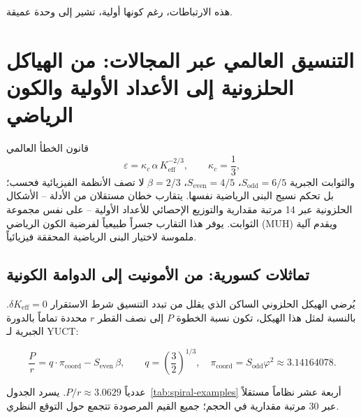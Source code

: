 \documentclass[11pt,a4paper]{article}
\newcommand{\ar}[1]{\foreignlanguage{arabic}{#1}}
\newcommand{\Keff}{K_{\mathrm{eff}}}
\newcommand{\eps}{\varepsilon}
\newcommand{\kappac}{\kappa_c}
\begin{document}
	\ar{هذه الارتباطات، رغم كونها أولية، تشير إلى وحدة عميقة.}
	
	\section{\ar{التنسيق العالمي عبر المجالات: من الهياكل الحلزونية إلى الأعداد الأولية والكون الرياضي}}
	\label{sec:universal}
	
	\ar{قانون الخطأ العالمي}
	\begin{equation}
		\eps = \kappac\,\alpha\,\Keff^{-2/3}, \qquad \kappac = \frac{1}{3},
		\label{eq:errorlaw}
	\end{equation}
	\ar{والثوابت الجبرية \(S_{\mathrm{odd}}=6/5\)، \(S_{\mathrm{even}}=4/5\)، \(\beta=2/3\) لا تصف الأنظمة الفيزيائية فحسب؛ بل تحكم نسيج البنى الرياضية نفسها. يتقارب خطان مستقلان من الأدلة – الأشكال الحلزونية عبر 14 مرتبة مقدارية والتوزيع الإحصائي للأعداد الأولية – على نفس مجموعة الثوابت. يوفر هذا التقارب جسراً طبيعياً لفرضية الكون الرياضي (MUH) ويقدم آلية ملموسة لاختيار البنى الرياضية المحققة فيزيائياً.}
	
	\subsection{\ar{تماثلات كسورية: من الأمونيت إلى الدوامة الكونية}}
	
	\ar{يُرضي الهيكل الحلزوني الساكن الذي يقلل من تبدد التنسيق شرط الاستقرار \(\delta K_{\mathrm{eff}} = 0\). بالنسبة لمثل هذا الهيكل، تكون نسبة الخطوة \(P\) إلى نصف القطر \(r\) محددة تماماً بالدورة الجبرية لـ YUCT:}
	
	\begin{equation}
		\boxed{ \frac{P}{r} = q \cdot \pi_{\mathrm{coord}} - S_{\mathrm{even}} \, \beta }, \qquad
		q = \left(\frac{3}{2}\right)^{1/3},\quad
		\pi_{\mathrm{coord}} = S_{\mathrm{odd}} \varphi^2 \approx 3.14164078.
		\label{eq:spiral-universal}
	\end{equation}
	
	\ar{عددياً \(P/r \approx 3.0629\). يسرد الجدول~\ref{tab:spiral-examples} أربعة عشر نظاماً مستقلاً عبر 30 مرتبة مقدارية في الحجم؛ جميع القيم المرصودة تتجمع حول التوقع النظري.}
	
\end{document}
